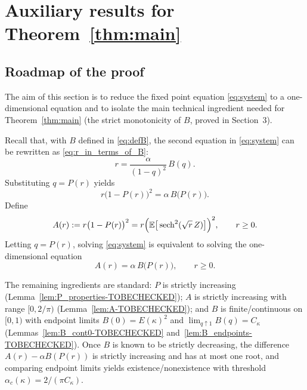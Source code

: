 \documentclass[11pt]{article}
\begin{document}
\section{Auxiliary results for Theorem~\ref{thm:main}}
\subsection{Roadmap of the proof}
The aim of this section is to reduce the fixed point equation \eqref{eq:system} to a one-dimensional equation and to isolate the main technical ingredient needed for Theorem~\ref{thm:main} (the strict monotonicity of $B$, proved in Section~3).

Recall that, with $B$ defined in \eqref{eq:defB}, the second equation in \eqref{eq:system} can be rewritten as \eqref{eq:r_in_terms_of_B}:
\[
r=\frac{\alpha}{(1-q)^2}\,B(q).
\]
Substituting $q=P(r)$ yields
\[
r\bigl(1-P(r)\bigr)^2=\alpha\,B\bigl(P(r)\bigr).
\]
Define
\begin{equation}\label{eq:defA}
A(r):=r\bigl(1-P(r)\bigr)^2
=r\Bigl(\mathbb E\big[\operatorname{sech}^2(\sqrt{r}\,Z)\big]\Bigr)^2,\qquad r\ge 0.
\end{equation}
Letting $q=P(r)$,
 solving \eqref{eq:system} is equivalent to solving the one-dimensional equation
\begin{equation}\label{eq:one-dimensional}
A(r)=\alpha\,B\bigl(P(r)\bigr),\qquad r\ge 0.
\end{equation}

The remaining ingredients are standard: $P$ is strictly increasing (Lemma~\ref{lem:P_properties-TOBECHECKED}); $A$ is strictly increasing with range $[0,2/\pi)$ (Lemma~\ref{lem:A-TOBECHECKED}); and $B$ is finite/continuous on $[0,1)$ with endpoint limits $B(0)=E(\kappa)^2$ and $\lim_{q\uparrow 1}B(q)=C_\kappa$ (Lemmas~\ref{lem:B_cont0-TOBECHECKED} and~\ref{lem:B_endpoints-TOBECHECKED}). Once $B$ is known to be strictly decreasing, the difference $A(r)-\alpha B(P(r))$ is strictly increasing and has at most one root, and comparing endpoint limits yields existence/nonexistence with threshold $\alpha_c(\kappa)=2/(\pi C_\kappa)$.
\end{document}
